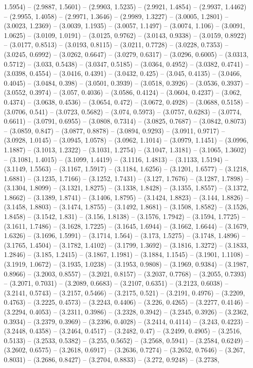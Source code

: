 1.5954) -- (2.9887, 1.5601) -- (2.9903, 1.5235) -- (2.9921, 1.4854) -- (2.9937, 1.4462) -- (2.9955, 1.4058) -- (2.9971, 1.3646) -- (2.9989, 1.3227) -- (3.0005, 1.2801) -- (3.0023, 1.2369) -- (3.0039, 1.1935) -- (3.0057, 1.1497) -- (3.0074, 1.106) -- (3.0091, 1.0625) -- (3.0109, 1.0191) -- (3.0125, 0.9762) -- (3.0143, 0.9338) -- (3.0159, 0.8922) -- (3.0177, 0.8513) -- (3.0193, 0.8115) -- (3.0211, 0.7728) -- (3.0228, 0.7353) -- (3.0245, 0.6992) -- (3.0262, 0.6647) -- (3.0279, 0.6317) -- (3.0296, 0.6005) -- (3.0313, 0.5712) -- (3.033, 0.5438) -- (3.0347, 0.5185) -- (3.0364, 0.4952) -- (3.0382, 0.4741) -- (3.0398, 0.4554) -- (3.0416, 0.4391) -- (3.0432, 0.425) -- (3.045, 0.4135) -- (3.0466, 0.4045) -- (3.0484, 0.398) -- (3.0501, 0.3939) -- (3.0518, 0.3926) -- (3.0536, 0.3937) -- (3.0552, 0.3974) -- (3.057, 0.4036) -- (3.0586, 0.4124) -- (3.0604, 0.4237) -- (3.062, 0.4374) -- (3.0638, 0.4536) -- (3.0654, 0.472) -- (3.0672, 0.4928) -- (3.0688, 0.5158) -- (3.0706, 0.541) -- (3.0723, 0.5682) -- (3.074, 0.5973) -- (3.0757, 0.6283) -- (3.0774, 0.6611) -- (3.0791, 0.6955) -- (3.0808, 0.7314) -- (3.0825, 0.7687) -- (3.0842, 0.8073) -- (3.0859, 0.847) -- (3.0877, 0.8878) -- (3.0894, 0.9293) -- (3.0911, 0.9717) -- (3.0928, 1.0145) -- (3.0945, 1.0578) -- (3.0962, 1.1014) -- (3.0979, 1.1451) -- (3.0996, 1.1887) -- (3.1013, 1.2322) -- (3.1031, 1.2754) -- (3.1047, 1.3181) -- (3.1065, 1.3602) -- (3.1081, 1.4015) -- (3.1099, 1.4419) -- (3.1116, 1.4813) -- (3.1133, 1.5194) -- (3.1149, 1.5563) -- (3.1167, 1.5917) -- (3.1184, 1.6256) -- (3.1201, 1.6577) -- (3.1218, 1.6881) -- (3.1235, 1.7166) -- (3.1252, 1.7431) -- (3.127, 1.7676) -- (3.1287, 1.7898) -- (3.1304, 1.8099) -- (3.1321, 1.8275) -- (3.1338, 1.8428) -- (3.1355, 1.8557) -- (3.1372, 1.8662) -- (3.1389, 1.8741) -- (3.1406, 1.8795) -- (3.1424, 1.8823) -- (3.144, 1.8826) -- (3.1458, 1.8803) -- (3.1474, 1.8755) -- (3.1492, 1.8681) -- (3.1508, 1.8582) -- (3.1526, 1.8458) -- (3.1542, 1.831) -- (3.156, 1.8138) -- (3.1576, 1.7942) -- (3.1594, 1.7725) -- (3.1611, 1.7486) -- (3.1628, 1.7225) -- (3.1645, 1.6944) -- (3.1662, 1.6644) -- (3.1679, 1.6326) -- (3.1696, 1.5991) -- (3.1714, 1.564) -- (3.173, 1.5275) -- (3.1748, 1.4896) -- (3.1765, 1.4504) -- (3.1782, 1.4102) -- (3.1799, 1.3692) -- (3.1816, 1.3272) -- (3.1833, 1.2846) -- (3.185, 1.2415) -- (3.1867, 1.1981) -- (3.1884, 1.1545) -- (3.1901, 1.1108) -- (3.1919, 1.0672) -- (3.1935, 1.0238) -- (3.1953, 0.9808) -- (3.1969, 0.9384) -- (3.1987, 0.8966) -- (3.2003, 0.8557) -- (3.2021, 0.8157) -- (3.2037, 0.7768) -- (3.2055, 0.7393) -- (3.2071, 0.7031) -- (3.2089, 0.6683) -- (3.2107, 0.6351) -- (3.2123, 0.6038) -- (3.2141, 0.5743) -- (3.2157, 0.5466) -- (3.2175, 0.521) -- (3.2191, 0.4976) -- (3.2209, 0.4763) -- (3.2225, 0.4573) -- (3.2243, 0.4406) -- (3.226, 0.4265) -- (3.2277, 0.4146) -- (3.2294, 0.4053) -- (3.2311, 0.3986) -- (3.2328, 0.3942) -- (3.2345, 0.3926) -- (3.2362, 0.3934) -- (3.2379, 0.3969) -- (3.2396, 0.4028) -- (3.2414, 0.4114) -- (3.243, 0.4223) -- (3.2448, 0.4358) -- (3.2464, 0.4517) -- (3.2482, 0.47) -- (3.2499, 0.4905) -- (3.2516, 0.5133) -- (3.2533, 0.5382) -- (3.255, 0.5652) -- (3.2568, 0.5941) -- (3.2584, 0.6249) -- (3.2602, 0.6575) -- (3.2618, 0.6917) -- (3.2636, 0.7274) -- (3.2652, 0.7646) -- (3.267, 0.8031) -- (3.2686, 0.8427) -- (3.2704, 0.8833) -- (3.272, 0.9248) -- (3.2738, 